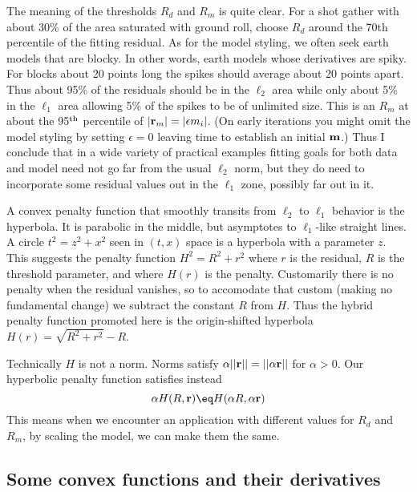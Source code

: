 \par
The meaning of the thresholds $R_d$ and $R_m$ is quite clear.
For a shot gather with
about 30\% of the area saturated with ground roll,
choose $R_d$ around the 70th percentile of the fitting residual.
As for the model styling,
we often seek earth models that are blocky.
In other words, earth models whose derivatives are spiky.
For blocks about 20 points long
the spikes should average about 20 points apart.
Thus about 95\% of the residuals should be in the $\ell_2$
area while only about 5\% in the $\ell_1$ area
allowing 5\% of the spikes to be of unlimited size.
This is an $R_m$ at about the 95$^{\rm th}$ percentile of $|\bold r_m| = |\epsilon m_i|$.
(On early iterations you might omit the model styling by setting $\epsilon=0$
leaving time to establish an initial $\bold m$.)
Thus I conclude that in a wide variety of practical examples
fitting goals for both data and model
need not go far from the usual $\ell_2$ norm,
but they do need to incorporate some residual values out in the $\ell_1$ zone,
possibly far out in it.
\par
A convex penalty function that smoothly transits from $\ell_2$ to $\ell_1$ behavior is the hyperbola.
It is parabolic in the middle,
but asymptotes to $\ell_1$-like straight lines.
A circle $t^2=z^2+x^2$ seen in $(t,x)$ space is a hyperbola with a parameter $z$.
This suggests the penalty function $H^2= R^2 + r^2$
where $r$ is the residual,
$R$ is the threshold parameter,
and where $H(r)$ is the penalty.
Customarily there is no penalty when the residual vanishes,
so to accomodate that custom
(making no fundamental change)
we subtract the constant $R$ from $H$.
Thus the hybrid penalty function promoted here
is the origin-shifted hyperbola
$H(r) = \sqrt{R^2 + r^2} - R$.

\par
Technically $H$ is not a norm.  Norms satisfy
$\alpha || \bold r|| = || \alpha \bold r ||$ for $\alpha > 0$.
Our hyperbolic penalty function satisfies instead
\begin{equation}
\alpha H(R,\bold r) \eq H(\alpha R, \alpha \bold r)
\end{equation}
This means when we encounter an application with different values for $R_d$ and $R_m$,
by scaling the model, we can make them the same.

\subsection{Some convex functions and their derivatives}

